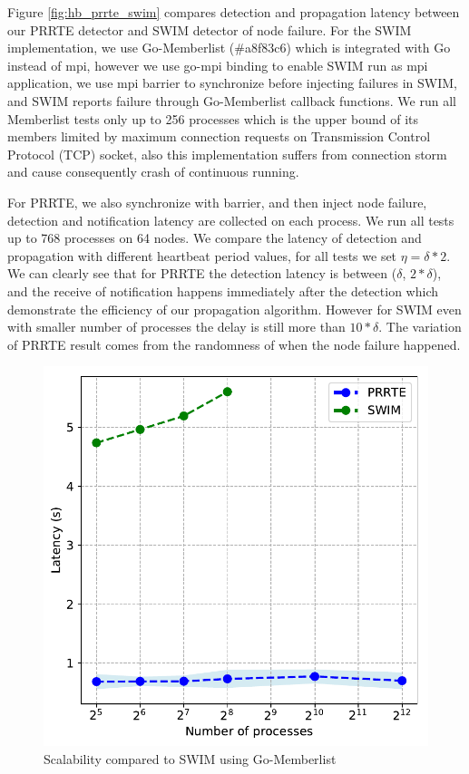 \documentclass[sigconf]{acmart}
\newcommand{\prrte}[0]{\textsc{PRRTE}\xspace}
\begin{document}
Figure \ref{fig:hb_prrte_swim} compares detection and propagation latency between our \prrte detector and SWIM detector of node failure. For the SWIM implementation, we use Go-Memberlist (\#a8f83c6) which is integrated with Go instead of mpi, however we use go-mpi binding to enable SWIM run as mpi application, we use mpi barrier to synchronize before injecting failures in SWIM, and SWIM reports failure through Go-Memberlist callback functions. We run all Memberlist tests only up to 256 processes which is the upper bound of its members limited by maximum connection requests on Transmission Control Protocol (TCP) socket, also this implementation suffers from connection storm and cause consequently crash of continuous running. 

For \prrte, we also synchronize with barrier, and then inject node failure, detection and notification latency are collected on each process. We run all tests up to 768 processes on 64 nodes. We compare the latency of detection and propagation with different heartbeat period values, for all tests we set $ \eta = \delta * 2 $. We can clearly see that for \prrte the detection latency is between ($\delta$, $2*\delta$), and the receive of notification happens immediately after the detection which demonstrate the efficiency of our propagation algorithm. However for SWIM even with smaller number of processes the delay is still more than $10*\delta$. The variation of \prrte result comes from the randomness of when the node failure happened.

\begin{figure}[h]
  \centering
  \includegraphics[width=\linewidth]{Scale_prrte_swim.pdf}
  \caption{Scalability compared to SWIM using Go-Memberlist}
  \label{fig:scale_swim}
\end{figure}
\end{document}
